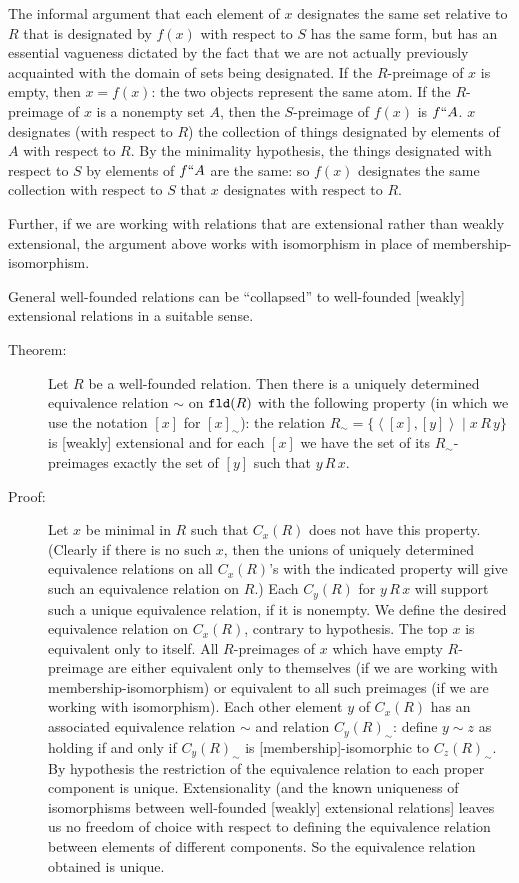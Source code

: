 \documentclass[12pt]{book}
\begin{document}
The informal argument that each element of $x$ designates the same set
relative to $R$ that is designated by $f(x)$ with respect to $S$ has
the same form, but has an essential vagueness dictated by the fact
that we are not actually previously acquainted with the domain of sets
being designated.  If the $R$-preimage of $x$ is empty, then $x=f(x)$:
the two objects represent the same atom.  If the $R$-preimage of $x$
is a nonempty set $A$, then the $S$-preimage of $f(x)$ is $f``A$.  $x$
designates (with respect to $R$) the collection of things designated
by elements of $A$ with respect to $R$.  By the minimality hypothesis,
the things designated with respect to $S$ by elements of $f``A$ are
the same: so $f(x)$ designates the same collection with respect to $S$
that $x$ designates with respect to $R$.

Further, if we are working with relations that are extensional rather
than weakly extensional, the argument above works with isomorphism in
place of membership-isomorphism.

General well-founded relations can be ``collapsed'' to well-founded
[weakly] extensional relations in a suitable sense.

\begin{description}

\item[Theorem:] Let $R$ be a well-founded relation.  Then there is a
uniquely determined equivalence relation $\sim$ on ${\tt fld}(R)$ with
the following property (in which we use the notation $[x]$ for
$[x]_{\sim}$): the relation $R_{\sim} = \{\left<[x],[y]\right>\mid
x\,R\,y\}$ is [weakly] extensional and for each $[x]$ we have the set
of its $R_{\sim}$-preimages exactly the set of $[y]$ such that
$y\,R\,x$.

\item[Proof:] Let $x$ be minimal in $R$ such that $C_x(R)$ does not
have this property.  (Clearly if there is no such $x$, then the unions
of uniquely determined equivalence relations on all $C_x(R)$'s with
the indicated property will give such an equivalence relation on $R$.)
Each $C_y(R)$ for $y \,R\, x$ will support such a unique equivalence
relation, if it is nonempty.  We define the desired equivalence
relation on $C_x(R)$, contrary to hypothesis.  The top $x$ is
equivalent only to itself.  All $R$-preimages of $x$ which have empty
$R$-preimage are either equivalent only to themselves (if we are
working with membership-isomorphism) or equivalent to all such
preimages (if we are working with isomorphism).  Each other element
$y$ of $C_x(R)$ has an associated equivalence relation $\sim$ and
relation $C_y(R)_{\sim}$: define $y \sim z$ as holding if and only if
$C_y(R)_{\sim}$ is [membership]-isomorphic to $C_z(R)_{\sim}$.  By
hypothesis the restriction of the equivalence relation to each proper
component is unique.  Extensionality (and the known uniqueness of
isomorphisms between well-founded [weakly] extensional relations]
leaves us no freedom of choice with respect to defining the
equivalence relation between elements of different components.  So the
equivalence relation obtained is unique.

\end{description}
\end{document}
